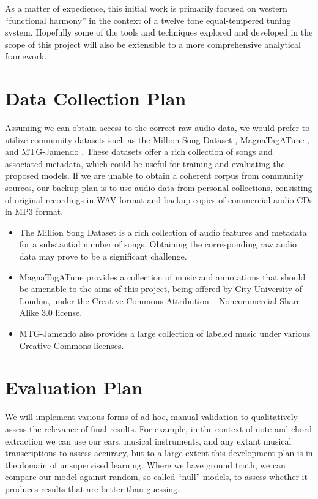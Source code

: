 \documentclass[12pt,english]{article}
\begin{document}
\noindent
As a matter of expedience, this initial work is primarily focused on western ``functional harmony'' in the context of a twelve tone equal-tempered tuning system. Hopefully some of the tools and techniques explored and developed in the scope of this project will also be extensible to a more comprehensive analytical framework.





\section{Data Collection Plan}
Assuming we can obtain access to the correct raw audio data, we would prefer to utilize community datasets such as the Million Song Dataset \cite{MillionSongDataset}, MagnaTagATune \cite{MagnaTagATune}, and MTG-Jamendo \cite{MTGJamendo}. These datasets offer a rich collection of songs and associated metadata, which could be useful for training and evaluating the proposed models. If we are unable to obtain a coherent corpus from community sources, our backup plan is to use audio data from personal collections, consisting of original recordings in WAV format and backup copies of commercial audio CDs in MP3 format.

\begin{itemize}
    \item The Million Song Dataset \cite{MillionSongDataset} is a rich collection of audio features and metadata for a substantial number of songs. Obtaining the corresponding raw audio data may prove to be a significant challenge.
    \item MagnaTagATune provides a collection of music and annotations that should be amenable to the aims of this project, being offered by City University of London, under the Creative Commons Attribution – Noncommercial-Share Alike 3.0 license.
    \item MTG-Jamendo also provides a large collection of labeled music under various Creative Commons licenses.
\end{itemize}

\section{Evaluation Plan}
We will implement various forms of ad hoc, manual validation to qualitatively assess the relevance of final results. For example, in the context of note and chord extraction we can use our ears, musical instruments, and any extant musical transcriptions to assess accuracy, but to a large extent this development plan is in the domain of unsupervised learning. Where we have ground truth, we can compare our model against random, so-called ``null'' models, to assess whether it produces results that are better than guessing.
\end{document}

